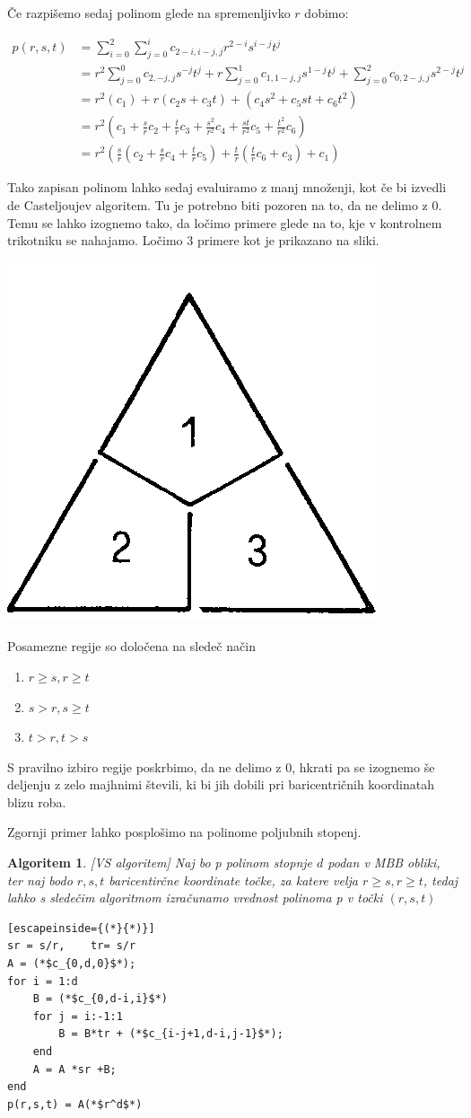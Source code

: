 \documentclass{article}
\newtheorem{algoritm}{Algoritem}[section]
\begin{document}
Če razpišemo sedaj polinom glede na spremenljivko $r$ dobimo:

\begin{align}
p(r,s,t) &= \sum_{i=0}^{2}\sum_{j=0}^{i}c_{2-i,i-j,j}r^{2-i}s^{i-j}t^j \nonumber \\ \nonumber
&= r^2\sum_{j=0}^{0}c_{2,-j,j}s^{-j}t^j + r\sum_{j=0}^{1}c_{1,1-j,j}s^{1-j}t^j + \sum_{j=0}^{2}c_{0,2-j,j}s^{2-j}t^j \\ \nonumber
&= r^2(c_1) + r(c_2s+c_3t) + (c_4s^2+c_5st+c_6t^2)\\ \nonumber
&= r^2(c_1+\frac{s}{r}c_2+\frac{t}{r}c_3+\frac{s^2}{r^2}c_4+\frac{st}{r^2}c_5+\frac{t^2}{r^2}c_6) \\ \nonumber
&= r^2(\frac{s}{r}(c_2+\frac{s}{r}c_4+\frac{t}{r}c_5)+\frac{t}{r}(\frac{t}{r}c_6+c_3)+c_1) \nonumber
\end{align}

Tako zapisan polinom lahko sedaj evaluiramo z manj množenji, kot če bi izvedli de Casteljoujev algoritem.
Tu je potrebno biti pozoren na to, da ne delimo z $0$. Temu se lahko izognemo tako, da ločimo primere glede na to, kje v kontrolnem trikotniku se nahajamo. Ločimo $3$ primere kot je prikazano na sliki.

\begin{center}
\includegraphics[width=.3\linewidth]{graf1.png}
\end{center}
Posamezne regije so določena na sledeč način
\begin{enumerate}
\item  $r \geq s, r \geq t$
\item $s > r, s \geq t$
\item $t>r, t>s$
\end{enumerate}

S pravilno izbiro regije poskrbimo, da ne delimo z $0$, hkrati pa se izognemo še deljenju z zelo majhnimi števili, ki bi jih dobili pri baricentričnih koordinatah blizu roba.

Zgornji primer lahko posplošimo na polinome poljubnih stopenj.

\begin{algoritm}
\label{MBB}[VS algoritem]
Naj bo p polinom stopnje $d$ podan v MBB obliki, ter naj bodo $ r,s,t$ baricentirčne koordinate točke, za katere velja $r \geq s,r \geq t$, tedaj lahko s sledečim algoritmom izračunamo vrednost polinoma p v točki $(r,s,t)$
\begin{lstlisting}[escapeinside={(*}{*)}]
sr = s/r,	 tr= s/r
A = (*$c_{0,d,0}$*);
for i = 1:d
    B = (*$c_{0,d-i,i}$*)
    for j = i:-1:1
        B = B*tr + (*$c_{i-j+1,d-i,j-1}$*);
    end
    A = A *sr +B;
end
p(r,s,t) = A(*$r^d$*)
\end{lstlisting}
\end{algoritm}
\end{document}
